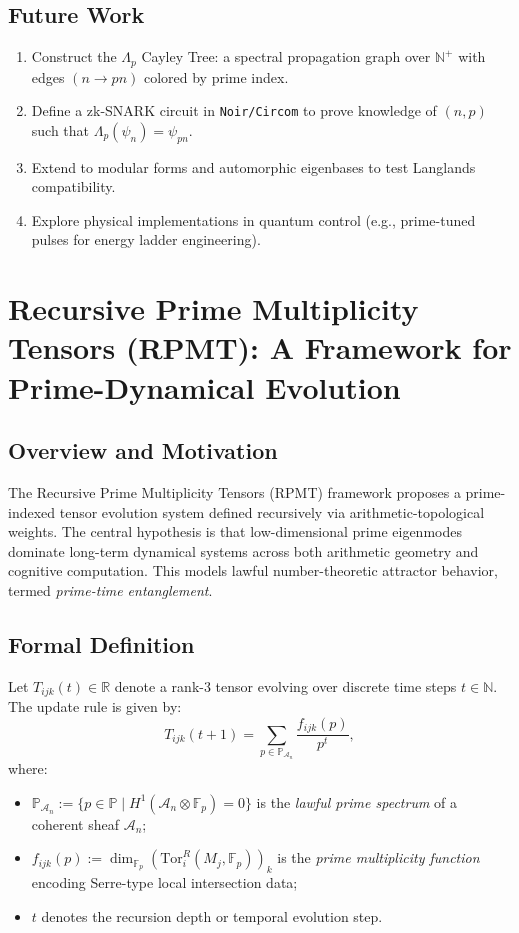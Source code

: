 \documentclass[12]{amsart}
\theoremstyle{plain}
\begin{document}
\subsection{Future Work}
\begin{enumerate}
    \item Construct the $\Lambda_p$ Cayley Tree: a spectral propagation graph over $\mathbb{N}^+$ with edges $(n \to pn)$ colored by prime index.
    \item Define a zk-SNARK circuit in \texttt{Noir/Circom} to prove knowledge of $(n, p)$ such that $\Lambda_p(\psi_n) = \psi_{pn}$.
    \item Extend to modular forms and automorphic eigenbases to test Langlands compatibility.
    \item Explore physical implementations in quantum control (e.g., prime-tuned pulses for energy ladder engineering).
\end{enumerate}


\section{Recursive Prime Multiplicity Tensors (RPMT): A Framework for Prime-Dynamical Evolution}

\subsection{Overview and Motivation}

The Recursive Prime Multiplicity Tensors (RPMT) framework proposes a prime-indexed tensor evolution system defined recursively via arithmetic-topological weights. The central hypothesis is that low-dimensional prime eigenmodes dominate long-term dynamical systems across both arithmetic geometry and cognitive computation. This models lawful number-theoretic attractor behavior, termed \textit{prime-time entanglement}.

\subsection{Formal Definition}

Let $T_{ijk}(t) \in \mathbb{R}$ denote a rank-3 tensor evolving over discrete time steps $t \in \mathbb{N}$. The update rule is given by:
\begin{equation}
    T_{ijk}(t+1) = \sum_{p \in \mathbb{P}_{\mathcal{A}_n}} \frac{f_{ijk}(p)}{p^t},
\end{equation}
where:
\begin{itemize}
    \item $\mathbb{P}_{\mathcal{A}_n} := \{ p \in \mathbb{P} \mid H^1(\mathcal{A}_n \otimes \mathbb{F}_p) = 0 \}$ is the \textit{lawful prime spectrum} of a coherent sheaf $\mathcal{A}_n$;
    \item $f_{ijk}(p) := \dim_{\mathbb{F}_p} \left( \mathrm{Tor}_i^R(M_j, \mathbb{F}_p) \right)_k$ is the \textit{prime multiplicity function} encoding Serre-type local intersection data;
    \item $t$ denotes the recursion depth or temporal evolution step.
\end{itemize}
\end{document}
